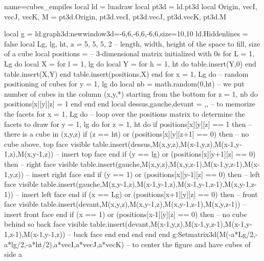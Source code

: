 \begin{luadraw}{name=cubes_empiles}
local ld = luadraw
local pt3d = ld.pt3d
local Origin, vecI, vecJ, vecK, M = pt3d.Origin, pt3d.vecI, pt3d.vecJ, pt3d.vecK, pt3d.M

local g = ld.graph3d:new{window3d={-6,6,-6,6,-6,6},size={10,10}}
ld.Hiddenlines = false
local Lg, lg, ht, a = 5, 5, 5, 2 -- length, width, height of the space to fill, size of a cube
local positions = {} -- 3-dimensional matrix initialized with 0s
for L = 1, Lg do
    local X = {}
    for l = 1, lg do
        local Y = {}
        for h = 1, ht do table.insert(Y,0) end
        table.insert(X,Y)
    end
    table.insert(positions,X)
end
for x = 1, Lg do  -- random positioning of cubes
    for y = 1, lg do
        local nb = math.random(0,ht) -- we put number of cubes in the column (x,y,*) starting from the bottom
        for z = 1, nb do positions[x][y][z] = 1 end
    end
end
local dessus,gauche,devant = {},{},{} -- to memorize the facets
for x = 1, Lg do -- loop over the positions matrix to determine the facets to draw
    for y = 1, lg do
        for z = 1, ht do
            if positions[x][y][z] == 1 then -- there is a cube in  (x,y,z)
                if (z == ht) or (positions[x][y][z+1] == 0) then -- no cube above, top face visible
                    table.insert(dessus,{M(x,y,z),M(x-1,y,z),M(x-1,y-1,z),M(x,y-1,z)}) -- insert top face
                end
                if (y == lg) or (positions[x][y+1][z] == 0) then -- right face visible
                    table.insert(gauche,{M(x,y,z),M(x,y,z-1),M(x-1,y,z-1),M(x-1,y,z)}) -- insert right face
                end
                if (y == 1) or (positions[x][y-1][z] == 0) then -- left face visible
                    table.insert(gauche,{M(x,y-1,z),M(x-1,y-1,z),M(x-1,y-1,z-1),M(x,y-1,z-1)}) -- insert left face
                end                    
                if (x == Lg) or (positions[x+1][y][z] == 0) then -- front face visible
                    table.insert(devant,{M(x,y,z),M(x,y-1,z),M(x,y-1,z-1),M(x,y,z-1)}) -- insert front face
                end
                if (x == 1) or (positions[x-1][y][z] == 0) then -- no cube behind so back face visible
                    table.insert(devant,{M(x-1,y,z),M(x-1,y,z-1),M(x-1,y-1,z-1),M(x-1,y-1,z)}) -- back face
                end
            end
        end
    end
end
g:Setmatrix3d({M(-a*Lg/2,-a*lg/2,-a*ht/2),a*vecI,a*vecJ,a*vecK}) -- to center the figure and have cubes of side a

\end{luadraw}
